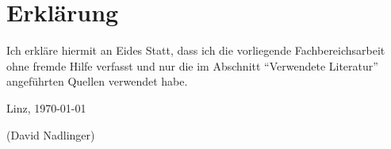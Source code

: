 \chapter*{Erklärung}

Ich erkläre hiermit an Eides Statt, dass ich die vorliegende Fachbereichsarbeit ohne fremde Hilfe verfasst und nur die im Abschnitt \enquote{Verwendete Literatur} angeführten Quellen verwendet habe.

\vspace{1cm}
Linz, \today

\vspace{0.6cm}
{\small(David Nadlinger)}